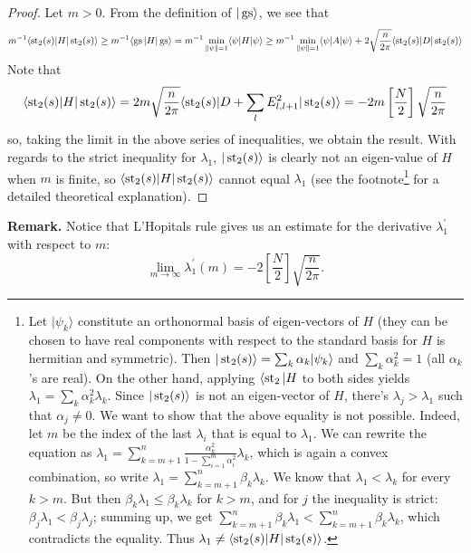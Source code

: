 \begin{proof}
Let $m > 0$. From the definition of $|\operatorname{gs}\rangle$, we see that
\[
m^{-1}\langle \operatorname{st}_2(s) | H| \operatorname{st}_2(s) \rangle \geq m^{-1}\langle \operatorname{gs} | H| \operatorname{gs} \rangle = m^{-1}\min_{\|\psi\|=1} \langle \psi |H|\psi\rangle \geq m^{-1}\min_{\|\psi\|=1} \langle \psi |A |\psi\rangle + 2\sqrt{\frac{n}{2\pi}} \langle \operatorname{st}_2(s) | D| \operatorname{st}_2(s)\rangle 
\]
Note that
\[
\langle \operatorname{st}_2(s) | H|\operatorname{st}_2(s) \rangle = 2m\sqrt{\frac{n}{2\pi}} \langle \operatorname{st}_2(s) | D + \sum_l E_{l,l+1}^2 | \operatorname{st}_2(s)\rangle = -2m\left[\frac{N}{2}\right]\sqrt{\frac{n}{2\pi}}
\]
so, taking the limit in the above series of inequalities, we obtain the result.
With regards to the strict inequality for $\lambda_1$, $|\operatorname{st}_2(s)\rangle$ is clearly not an eigen-value of $H$ when $m$ is finite, so $\langle\operatorname{st}_2(s)|H|\operatorname{st}_2(s)\rangle$ cannot equal $\lambda_1$ (see the footnote\footnote{Let $|\psi_k\rangle$ constitute an orthonormal basis of eigen-vectors of $H$ (they can be chosen to have real components with respect to the standard basis for $H$ is hermitian and symmetric). Then $|\operatorname{st}_2(s)\rangle = \sum_{k} \alpha_k |\psi_k\rangle$ and $\sum_{k}\alpha_k^2 = 1$ (all $\alpha_k$'s are real). On the other hand, applying $\langle \operatorname{st}_2 |H$ to both sides yields $\lambda_1 = \sum_{k} \alpha_k^2 \lambda_k$. Since $|\operatorname{st}_2(s)\rangle$ is not an eigen-vector of $H$, there's $\lambda_j > \lambda_1$ such that $\alpha_j \neq 0$. We want to show that the above equality is not possible. Indeed, let $m$ be the index of the last $\lambda_i$ that is equal to $\lambda_1$. We can rewrite the equation as $\lambda_1 = \sum_{k=m+1}^n \frac{\alpha_k^2}{1-\sum_{i=1}^m \alpha_i^2} \lambda_k$, which is again a convex combination, so write $\lambda_1 = \sum_{k=m+1}^n \beta_k\lambda_k$. We know that $\lambda_1 < \lambda_{k}$ for every $k> m$. But then $\beta_k\lambda_1 \leq \beta_k\lambda_k$ for $k > m$, and for $j$ the inequality is strict: $\beta_j\lambda_1 < \beta_j\lambda_j$; summing up, we get $\sum_{k=m+1}^n \beta_k\lambda_1 < \sum_{k=m+1}^n \beta_k \lambda_k$, which contradicts the equality. Thus $\lambda_1 \neq \langle \operatorname{st}_2(s)|H|\operatorname{st}_2(s)\rangle$.

} for a detailed theoretical explanation).
\end{proof}
\noindent \textbf{Remark.} Notice that L'Hopitals rule gives us an estimate for the derivative $\lambda_1^\prime$ with respect to $m$:
\[
\lim_{m \rightarrow \infty} \lambda_1^\prime(m) = -2\left[\frac{N}{2}\right] \sqrt{\frac{n}{2\pi}}.
\]

